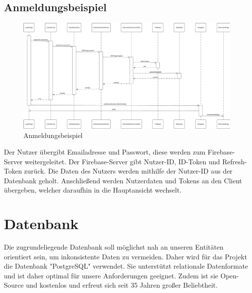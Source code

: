 \documentclass{entwurfsheft}
\begin{document}
\subsection{Anmeldungsbeispiel}
\begin{figure}[htp]
    \centering
    \includegraphics[width = \linewidth]{images/firebase/sqd_login.pdf}
    \caption{Anmeldungsbeispiel}
\end{figure}
Der Nutzer übergibt Emailadresse und Passwort, diese werden zum Firebase-Server weitergeleitet. Der Firebase-Server gibt Nutzer-ID, ID-Token und Refresh-Token zurück. Die Daten des Nutzers werden mithilfe der Nutzer-ID aus der Datenbank geholt. Anschließend werden Nutzerdaten und Tokens an den Client übergeben, welcher daraufhin in die Hauptansicht wechselt.

\newpage

\section{Datenbank}
Die zugrundeliegende Datenbank soll möglichst nah an unseren Entitäten orientiert sein, um inkonsistente Daten zu vermeiden. Daher wird für das Projekt die Datenbank "PostgreSQL" verwendet. Sie unterstützt relationale Datenformate und ist daher optimal für unsere Anforderungen geeignet. Zudem ist sie Open-Source und kostenlos und erfreut sich seit 35 Jahren großer Beliebtheit.
\end{document}
